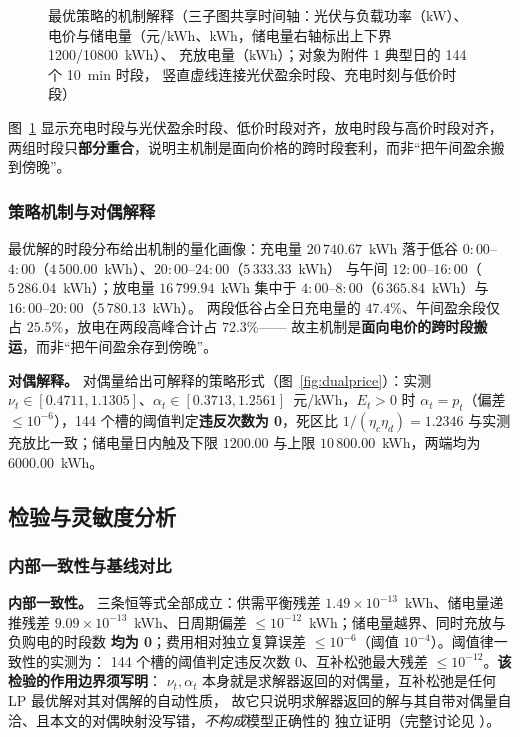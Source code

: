 \begin{figure}[htbp]
  \centering
  \caption{最优策略的机制解释（三子图共享时间轴：光伏与负载功率（\unit{kW}）、
            电价与储电量（\unit{元/kWh}、\unit{kWh}，储电量右轴标出上下界 1200/10800~\unit{kWh}）、
            充放电量（\unit{kWh}）；对象为附件 1 典型日的 144 个 10~\unit{min} 时段，
            竖直虚线连接光伏盈余时段、充电时刻与低价时段）}
  \label{fig:mechanism}
\end{figure}

图~\ref{fig:mechanism} 显示充电时段与光伏盈余时段、低价时段对齐，放电时段与高价时段对齐，
两组时段只\textbf{部分重合}，说明主机制是面向价格的跨时段套利，而非“把午间盈余搬到傍晚”。

\subsubsection{策略机制与对偶解释}

最优解的时段分布给出机制的量化画像：充电量 \(20\,740.67\)~kWh 落于低谷
\(0{:}00\)--\(4{:}00\)（\(4\,500.00\)~kWh）、\(20{:}00\)--\(24{:}00\)（\(5\,333.33\)~kWh）
与午间 \(12{:}00\)--\(16{:}00\)（\(5\,286.04\)~kWh）；放电量 \(16\,799.94\)~kWh 集中于
\(4{:}00\)--\(8{:}00\)（\(6\,365.84\)~kWh）与 \(16{:}00\)--\(20{:}00\)（\(5\,780.13\)~kWh）。
两段低谷占全日充电量的 \(47.4\%\)、午间盈余段仅占 \(25.5\%\)，放电在两段高峰合计占 \(72.3\%\)——
故主机制是\textbf{面向电价的跨时段搬运}，而非“把午间盈余存到傍晚”。

\textbf{对偶解释。} 对偶量给出可解释的策略形式（图~\ref{fig:dualprice}）：实测
\(\nu_t\in[0.4711,1.1305]\)、\(\alpha_t\in[0.3713,1.2561]\)~元/kWh，\(E_t>0\) 时
\(\alpha_t=p_t\)（偏差 \(\le10^{-6}\)），144 个槽的阈值判定\textbf{违反次数为 0}，死区比
\(1/(\eta_c\eta_d)=1.2346\) 与实测充放比一致；储电量日内触及下限 \(1200.00\) 与上限
\(10\,800.00\)~kWh，两端均为 \(6000.00\)~kWh。

\subsection{检验与灵敏度分析}

\subsubsection{内部一致性与基线对比}

\textbf{内部一致性。} 三条恒等式全部成立：供需平衡残差 \(1.49\times10^{-13}\)~kWh、储电量递推残差
\(9.09\times10^{-13}\)~kWh、日周期偏差 \(\le10^{-12}\)~kWh；储电量越界、同时充放与负购电的时段数
\textbf{均为 0}；费用相对独立复算误差 \(\le10^{-6}\)（阈值 \(10^{-4}\)）。阈值律一致性的实测为：
144 个槽的阈值判定违反次数 0、互补松弛最大残差 \(\le10^{-12}\)。\textbf{该检验的作用边界须写明}：
\(\nu_t,\alpha_t\) 本身就是求解器返回的对偶量，互补松弛是任何 LP 最优解对其对偶解的自动性质，
故它只说明求解器返回的解与其自带对偶量自洽、且本文的对偶映射没写错，\emph{不构成}模型正确性的
独立证明（完整讨论见 ）。

